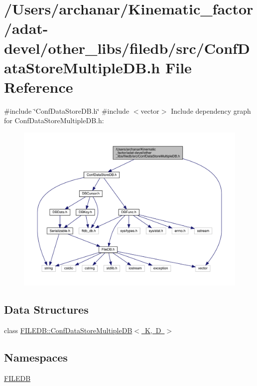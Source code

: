 \hypertarget{adat-devel_2other__libs_2filedb_2src_2ConfDataStoreMultipleDB_8h}{}\section{/\+Users/archanar/\+Kinematic\+\_\+factor/adat-\/devel/other\+\_\+libs/filedb/src/\+Conf\+Data\+Store\+Multiple\+DB.h File Reference}
\label{adat-devel_2other__libs_2filedb_2src_2ConfDataStoreMultipleDB_8h}
{\ttfamily \#include \char`\"{}Conf\+Data\+Store\+D\+B.\+h\char`\"{}}\newline
{\ttfamily \#include $<$vector$>$}\newline
Include dependency graph for Conf\+Data\+Store\+Multiple\+D\+B.\+h\+:
\nopagebreak
\begin{figure}[H]
\begin{center}
\leavevmode
\includegraphics[width=350pt]{d7/d12/adat-devel_2other__libs_2filedb_2src_2ConfDataStoreMultipleDB_8h__incl}
\end{center}
\end{figure}
\subsection*{Data Structures}
\begin{DoxyCompactItemize}
\item 
class \mbox{\hyperlink{classFILEDB_1_1ConfDataStoreMultipleDB}{F\+I\+L\+E\+D\+B\+::\+Conf\+Data\+Store\+Multiple\+D\+B$<$ K, D $>$}}
\end{DoxyCompactItemize}
\subsection*{Namespaces}
\begin{DoxyCompactItemize}
\item 
 \mbox{\hyperlink{namespaceFILEDB}{F\+I\+L\+E\+DB}}
\end{DoxyCompactItemize}
